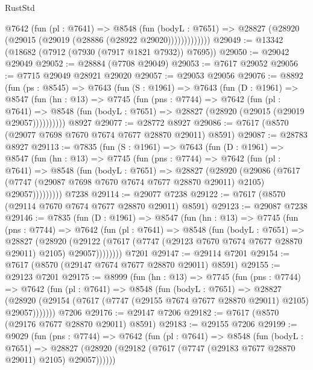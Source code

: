 \begin{lexlean}{RustStd}
\begin{coremodule}
              @7642
                (fun (pl : @7641) =>
                @8548
                  (fun (bodyL : @7651) =>
                  @28827 (@28920 (@29015 (@29019 (@28886 (@28922 @29020)))))))))))))
@29049 := @13342 (@18682 (@7912 (@7930 (@7917 @1821 @7932)) @7695))
@29050 := @29042 @29049
@29052 := @28884 (@7708 @29049)
@29053 := @7617 @29052
@29056 := @7715 @29049 @28921 @29020
@29057 := @29053 @29056
@29076 := @8892
    (fun (ps : @8545) =>
    @7643
      (fun (S : @1961) =>
      @7643
        (fun (D : @1961) =>
        @8547
          (fun (hn : @13) =>
          @7745
            (fun (pns : @7744) =>
            @7642
              (fun (pl : @7641) =>
              @8548 (fun (bodyL : @7651) => @28827 (@28920 (@29015 (@29019 @29057))))))))))
    @8927
@29077 := @28772 @8927
@29086 := @7617 (@8570 (@29077 @7698 @7670 @7674 @7677 @28870 @29011) @8591)
@29087 := @28783 @8927
@29113 := @7835
    (fun (S : @1961) =>
    @7643
      (fun (D : @1961) =>
      @8547
        (fun (hn : @13) =>
        @7745
          (fun (pns : @7744) =>
          @7642
            (fun (pl : @7641) =>
            @8548
              (fun (bodyL : @7651) =>
              @28827
                (@28920
                  (@29086
                    (@7617
                      (@7747 (@29087 @7698 @7670 @7674 @7677 @28870 @29011) @2105)
                      @29057)))))))))
    @7238
@29114 := @29077 @7238
@29122 := @7617 (@8570 (@29114 @7670 @7674 @7677 @28870 @29011) @8591)
@29123 := @29087 @7238
@29146 := @7835
    (fun (D : @1961) =>
    @8547
      (fun (hn : @13) =>
      @7745
        (fun (pns : @7744) =>
        @7642
          (fun (pl : @7641) =>
          @8548
            (fun (bodyL : @7651) =>
            @28827
              (@28920
                (@29122 (@7617 (@7747 (@29123 @7670 @7674 @7677 @28870 @29011) @2105) @29057))))))))
    @7201
@29147 := @29114 @7201
@29154 := @7617 (@8570 (@29147 @7674 @7677 @28870 @29011) @8591)
@29155 := @29123 @7201
@29175 := @8999
    (fun (hn : @13) =>
    @7745
      (fun (pns : @7744) =>
      @7642
        (fun (pl : @7641) =>
        @8548
          (fun (bodyL : @7651) =>
          @28827
            (@28920 (@29154 (@7617 (@7747 (@29155 @7674 @7677 @28870 @29011) @2105) @29057)))))))
    @7206
@29176 := @29147 @7206
@29182 := @7617 (@8570 (@29176 @7677 @28870 @29011) @8591)
@29183 := @29155 @7206
@29199 := @9029
    (fun (pns : @7744) =>
    @7642
      (fun (pl : @7641) =>
      @8548
        (fun (bodyL : @7651) =>
        @28827 (@28920 (@29182 (@7617 (@7747 (@29183 @7677 @28870 @29011) @2105) @29057))))))

\end{coremodule}
\end{lexlean}
